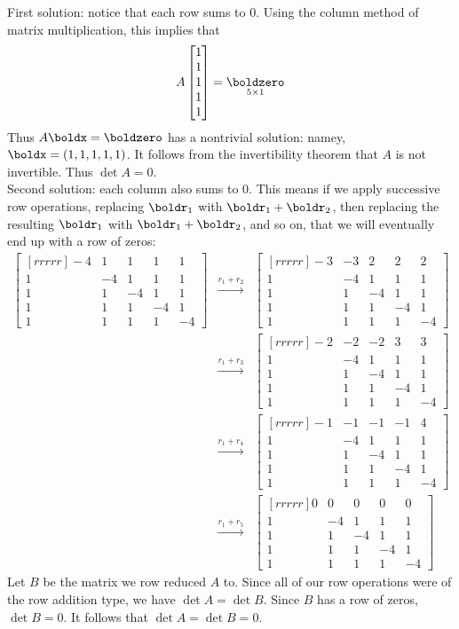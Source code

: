 \begin{solution}
\noindent First solution: notice that each row sums to 0. Using the column method of matrix multiplication, this implies that 
\[
A\begin{bmatrix}
1\\ 1\\ 1\\ 1\\ 1
\end{bmatrix}=\underset{5\times 1}{\boldzero}
\]
Thus $A\boldx=\boldzero$ has a nontrivial solution: namey, $\boldx=(1,1,1,1,1)$. It follows from the invertibility theorem that $A$ is not invertible. Thus $\det A=0$. 
\\
Second solution: each column also sums to 0. This means if we apply successive row operations, replacing $\boldr_1$ with $\boldr_1+\boldr_2$, then replacing the resulting $\boldr_1$ with $\boldr_1+\boldr_2$, and so on, that we will eventually end up with a row of zeros:
\begin{eqnarray*}
\begin{bmatrix}[rrrrr]
-4&1&1&1&1\\
1&-4&1&1&1\\
1&1&-4&1&1\\
1&1&1&-4&1\\
1&1&1&1&-4
\end{bmatrix}
&\xrightarrow[]{r_1 + r_2}&
\begin{bmatrix}[rrrrr]
-3&-3&2&2&2\\
1&-4&1&1&1\\
1&1&-4&1&1\\
1&1&1&-4&1\\
1&1&1&1&-4
\end{bmatrix}\\
&\xrightarrow[]{r_1 + r_3}&
\begin{bmatrix}[rrrrr]
-2&-2&-2&3&3\\
1&-4&1&1&1\\
1&1&-4&1&1\\
1&1&1&-4&1\\
1&1&1&1&-4
\end{bmatrix}\\
&\xrightarrow[]{r_1 + r_4}&
\begin{bmatrix}[rrrrr]
-1&-1&-1&-1&4\\
1&-4&1&1&1\\
1&1&-4&1&1\\
1&1&1&-4&1\\
1&1&1&1&-4
\end{bmatrix}\\
&\xrightarrow[]{r_1 + r_5}&
\begin{bmatrix}[rrrrr]
0&0&0&0&0\\
1&-4&1&1&1\\
1&1&-4&1&1\\
1&1&1&-4&1\\
1&1&1&1&-4
\end{bmatrix}
\end{eqnarray*}
Let $B$ be the matrix we row reduced $A$ to. Since all of our row operations were of the row addition type, we have $\det A=\det B$. Since $B$ has a row of zeros, $\det B=0$. It follows that $\det A=\det B=0$. 
\end{solution}
